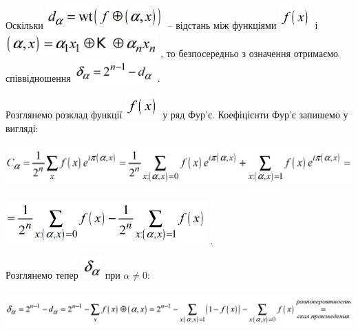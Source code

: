 \documentclass[a4paper]{article}
\newcounter{}
\begin{document}
 Оскільки 
\includegraphics[width=1.7874in,height=0.3547in]{crypt-img/crypt-img278.png}  –
відстань між функціями 
\includegraphics[width=0.4862in,height=0.3366in]{crypt-img/crypt-img279.png}  і
 \includegraphics[width=2.2984in,height=0.3764in]{crypt-img/crypt-img280.png} ,
то безпосередньо з означення отримаємо співвідношення 
\includegraphics[width=1.2154in,height=0.3346in]{crypt-img/crypt-img281.png} . 

\textcolor[rgb]{0.0,0.5019608,0.0}{Розглянемо} розклад функції 
\includegraphics[width=0.5165in,height=0.3583in]{crypt-img/crypt-img282.png}  у
ряд Фур’є. Коефіцієнти Фур’є запишемо у вигляді:

{\centering 
\includegraphics[width=6.3945in,height=0.6598in]{crypt-img/crypt-img283.png}
\par}

 \includegraphics[width=3.0472in,height=0.6417in]{crypt-img/crypt-img284.png} .

\textcolor[rgb]{0.0,0.5019608,0.0}{Розглянемо} тепер 
\includegraphics[width=0.3091in,height=0.3382in]{crypt-img/crypt-img285.png} 
при  ${\alpha \neq 0}$:

{\centering 
\includegraphics[width=6.8465in,height=0.5835in]{crypt-img/crypt-img286.png}
\par}
\end{document}
